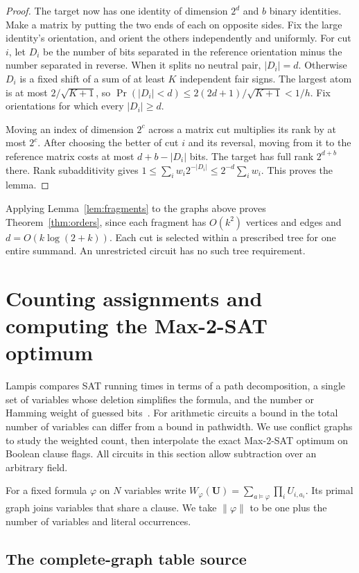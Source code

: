 \documentclass[11pt]{article}
\theoremstyle{definition}
\begin{document}
\begin{proof}
The target now has one identity of dimension \(2^d\) and \(b\) binary identities. Make a matrix by putting the two ends of each on opposite sides. Fix the large identity's orientation, and orient the others independently and uniformly. For cut \(i\), let \(D_i\) be the number of bits separated in the reference orientation minus the number separated in reverse. When it splits no neutral pair, \(|D_i|=d\). Otherwise \(D_i\) is a fixed shift of a sum of at least \(K\) independent fair signs. The largest atom is at most \(2/\sqrt{K+1}\), so \(\Pr(|D_i|<d)\le 2(2d+1)/\sqrt{K+1}<1/h\). Fix orientations for which every \(|D_i|\ge d\).

Moving an index of dimension \(2^c\) across a matrix cut multiplies its rank by at most \(2^c\). After choosing the better of cut \(i\) and its reversal, moving from it to the reference matrix costs at most \(d+b-|D_i|\) bits. The target has full rank \(2^{d+b}\) there. Rank subadditivity gives \(1\le\sum_i w_i2^{-|D_i|}\le 2^{-d}\sum_iw_i\). This proves the lemma.
\end{proof}
Applying Lemma~\ref{lem:fragments} to the graphs above proves Theorem~\ref{thm:orders}, since each fragment has \(O(k^2)\) vertices and edges and \(d=O(k\log(2+k))\). Each cut is selected within a prescribed tree for one entire summand. An unrestricted circuit has no such tree requirement.

\section{Counting assignments and computing the Max-2-SAT optimum}\label{sec:sat}

Lampis compares SAT running times in terms of a path decomposition, a single set of variables whose deletion simplifies the formula, and the number or Hamming weight of guessed bits~\cite{lampis-shades}. For arithmetic circuits a bound in the total number of variables can differ from a bound in pathwidth. We use conflict graphs to study the weighted count, then interpolate the exact Max-2-SAT optimum on Boolean clause flags. All circuits in this section allow subtraction over an arbitrary field.

For a fixed formula \(\varphi\) on \(N\) variables write \(W_\varphi(\mathbf U)=\sum_{a\models\varphi}\prod_i U_{i,a_i}\). Its primal graph joins variables that share a clause. We take \(\|\varphi\|\) to be one plus the number of variables and literal occurrences.

\subsection{The complete-graph table source}
\end{document}
